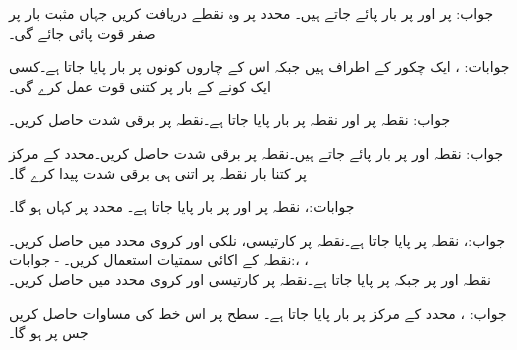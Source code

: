  جواب:
 پر  اور  پر  بار پائے جاتے ہیں۔ محدد پر وہ نقطے دریافت کریں جہاں مثبت بار پر صفر قوت پائی جائے گی۔

جوابات: ، 
ایک چکور کے اطراف  ہیں جبکہ اس کے چاروں کونوں پر  بار پایا جاتا ہے۔کسی ایک کونے کے بار پر کتنی قوت عمل کرے گی۔

جواب:
نقطہ  پر  اور نقطہ  پر  بار پایا جاتا ہے۔نقطہ  پر برقی شدت  حاصل کریں۔

جواب:
نقطہ  اور  پر  بار پائے جاتے ہیں۔نقطہ  پر برقی شدت  حاصل کریں۔محدد کے مرکز پر کتنا بار نقطہ  پر اتنی ہی برقی شدت پیدا کرے گا۔

جوابات:، 
نقطہ  پر  اور  پر  بار پایا جاتا ہے۔ محدد پر کہاں  ہو گا۔

جواب:، 
نقطہ  پر  پایا جاتا ہے۔نقطہ  پر کارتیسی، نلکی اور کروی  محدد میں  حاصل کریں۔نقطہ  کے اکائی سمتیات استعمال کریں۔
-
جوابات:، ، \\
نقطہ  اور  پر  جبکہ  پر  پایا جاتا ہے۔نقطہ  پر کارتیسی اور کروی محدد میں  حاصل کریں۔

جواب: ، 
محدد کے مرکز پر  بار پایا جاتا ہے۔ سطح  پر اس خط کی مساوات حاصل کریں جس پر  ہو گا۔

